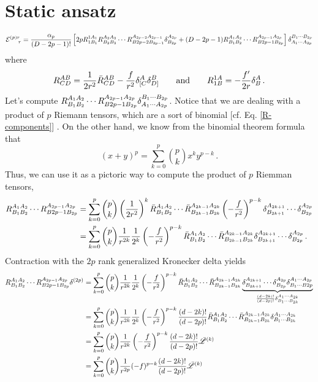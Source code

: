 \section{Static ansatz}
\begin{align}
	\mathcal{E}^{(p)r}_{~~~~r}=\frac{\alpha_p}{(D-2p-1)!}\left[2pR^{1A_1}_{1B_1}R^{A_2A_3}_{B_2B_3}\cdots R^{A_{2p-2}A_{2p-1}}_{B{2p-2}B_{2p-1}}\delta^{A_{2p}}_{B_{2p}}+(D-2p-1)R^{A_{1}A_2}_{B_1B_2}\cdots R^{A_{2p-1}A_{2p}}_{B{2p-1}B_{2p}}\right]\delta^{B_1\cdots B_{2p}}_{A_1\cdots A_{2p}}
\end{align}
where
\begin{equation}\label{R-components}
	R^{AB}_{CD}=\frac{1}{2r^2}\bar{R}^{AB}_{CD}-\frac{f}{r^2}\delta^{A}_{[C}\delta^B_{D]}\qquad \text{and}\qquad R^{1A}_{1B}=-\frac{f'}{2r}\delta^{A}_B\,.
\end{equation}
Let's compute $R^{A_{1}A_2}_{B_1B_2}\cdots R^{A_{2p-1}A_{2p}}_{B{2p-1}B_{2p}}\delta^{B_1\cdots B_{2p}}_{A_1\cdots A_{2p}}$. Notice that we are dealing with a product of $p$ Riemann tensors, which are a sort of binomial [cf. Eq. \eqref{R-components}] . On the other hand, we know from the binomial theorem formula that
\begin{equation}
  (x+y)^p=\sum_{k=0}^p\binom{p}{k}x^k y^{p-k}\,.
\end{equation}
Thus, we can use it as a pictoric way to compute the product of $p$ Riemman tensors,
\begin{align}
  R^{A_{1}A_2}_{B_1B_2}\cdots R^{A_{2p-1}A_{2p}}_{B{2p-1}B_{2p}}&=\sum_{k=0}^p\binom{p}{k}\left(\frac{1}{2r^2}\right)^k\bar{R}^{A_1A_2}_{B_1B_2}\cdots \bar{R}^{A_{2k-1}A_{2k}}_{B_{2k-1}B_{2k}}\left(-\frac{f}{r^2}\right)^{p-k}\delta^{A_{2k+1}}_{B_{2k+1}}\cdots \delta^{A_{2p}}_{B_{2p}}\\
  &=\sum_{k=0}^p\binom{p}{k}\frac{1}{r^{2k}}\frac{1}{2^k}\left(-\frac{f}{r^2}\right)^{p-k}\bar{R}^{A_1A_2}_{B_1B_2}\cdots \bar{R}^{A_{2k-1}A_{2k}}_{B_{2k-1}B_{2k}}\delta^{A_{2k+1}}_{B_{2k+1}}\cdots \delta^{A_{2p}}_{B_{2p}}\,.
\end{align}
Contraction with the $2p$ rank generalized Kronecker delta yields
\begin{align}
  R^{A_{1}A_2}_{B_1B_2}\cdots R^{A_{2p-1}A_{2p}}_{B{2p-1}B_{2p}}\delta^{(2p)}&=\sum_{k=0}^p\binom{p}{k}\frac{1}{r^{2k}}\frac{1}{2^k}\left(-\frac{f}{r^2}\right)^{p-k}\bar{R}^{A_1A_2}_{B_1B_2}\cdots \bar{R}^{A_{2k-1}A_{2k}}_{B_{2k-1}B_{2k}}\underbrace{\delta^{A_{2k+1}}_{B_{2k+1}}\cdots \delta^{A_{2p}}_{B_{2p}}\delta^{A_1\cdots A_{2p}}_{B_1\cdots B{2p}}}_{\frac{(d-2k)!}{(d-2p)!}\delta^{A_1\cdots A_{2k}}_{B_1\cdots B_{2k}}}\\
  &=\sum_{k=0}^p\binom{p}{k}\frac{1}{r^{2k}}\frac{1}{2^k}\left(-\frac{f}{r^2}\right)^{p-k}\frac{(d-2k)!}{(d-2p)!}\bar{R}^{A_1A_2}_{B_1B_2}\cdots \bar{R}^{A_{2k-1}A_{2k}}_{B_{2k-1}B_{2k}}\delta^{A_1\cdots A_{2k}}_{B_1\cdots B_{2k}}\\
  &=\sum_{k=0}^p\binom{p}{k}\frac{1}{r^{2k}}\left(-\frac{f}{r^2}\right)^{p-k}\frac{(d-2k)!}{(d-2p)!}\bar{\mathscr{L}}^{(k)}\\
  &=\sum_{k=0}^p\binom{p}{k}\frac{1}{r^{2p}}(-f)^{p-k}\frac{(d-2k)!}{(d-2p)!}\bar{\mathscr{L}}^{(k)}
\end{align}
